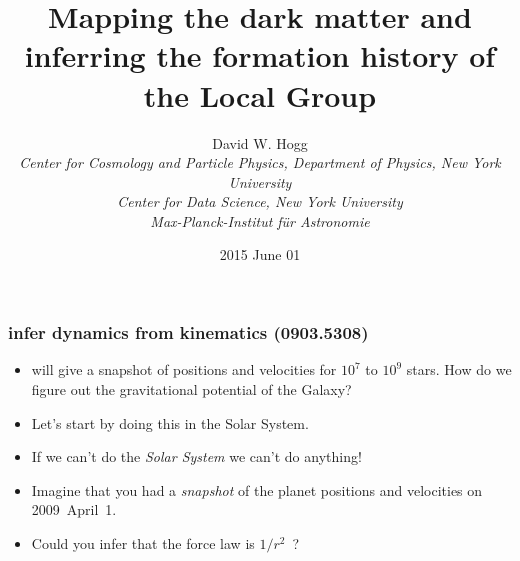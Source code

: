 \documentclass[pdftex]{beamer}
\title{Mapping the dark matter and inferring the formation history of the Local Group}
\author[David W. Hogg (NYU)]{David W. Hogg \\
  \textsl{\small Center for Cosmology and Particle Physics, Department of Physics,
                 New York University}\\
  \textsl{\small Center for Data Science,
                 New York University}\\
  \textsl{\small Max-Planck-Institut f\"ur Astronomie}}
\date{2015 June 01}
\begin{document}
\begin{frame}
  \titlepage
\end{frame}

\begin{frame}
  \frametitle{infer dynamics from kinematics {\small (0903.5308)}}
  \begin{itemize}
  \item {} will give a snapshot of positions and
    velocities for $10^7$ to $10^9$ stars.  How do we figure out the
    gravitational potential of the Galaxy?
  \item<2-> Let's start by doing this in the Solar System.
  \item<2-> If we can't do the \emph{Solar System} we can't do anything!
  \item<2-> Imagine that you had a \emph{snapshot} of the planet positions
    and velocities on 2009~April~1.
  \item<2-> Could you infer that the force law is $1/r^2$~?
  \end{itemize}
\end{frame}
\end{document}
